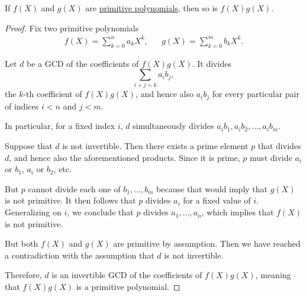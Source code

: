 \begin{lemma}\label{thm:gauss_lemma}
  If \( f(X) \) and \( g(X) \) are \hyperref[def:domain_primitive_polynomial]{primitive polynomials}, then so is \( f(X) g(X) \).
\end{lemma}
\begin{proof}
  Fix two primitive polynomials
  \begin{align*}
    f(X) = \sum_{k=0}^n a_k X^k,
    &&
    g(X) = \sum_{k=0}^m b_k X^k.
  \end{align*}

  Let \( d \) be a GCD of the coefficients of \( f(X) g(X) \). It divides
  \begin{equation*}
    \sum_{i+j=k} a_i b_j,
  \end{equation*}
  the \( k \)-th coefficient of \( f(X) g(X) \), and hence also \( a_i b_j \) for every particular pair of indices \( i < n \) and \( j < m \).

  In particular, for a fixed index \( i \), \( d \) simultaneously divides \( a_i b_1, a_i b_2, \ldots, a_i b_m \).

  Suppose that \( d \) is not invertible. Then there exists a prime element \( p \) that divides \( d \), and hence also the aforementioned products. Since it is prime, \( p \) must divide \( a_i \) or \( b_1 \), \( a_i \) or \( b_2 \), etc.

  But \( p \) cannot divide each one of \( b_1, \ldots, b_m \) because that would imply that \( g(X) \) is not primitive. It then follows that \( p \) divides \( a_i \) for a fixed value of \( i \). Generalizing on \( i \), we conclude that \( p \) divides \( a_1, \ldots, a_n \), which implies that \( f(X) \) is not primitive.

  But both \( f(X) \) and \( g(X) \) are primitive by assumption. Then we have reached a contradiction with the assumption that \( d \) is not invertible.

  Therefore, \( d \) is an invertible GCD of the coefficients of \( f(X) g(X) \), meaning that \( f(X) g(X) \) is a primitive polynomial.
\end{proof}

